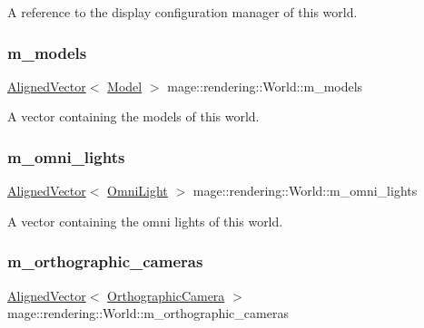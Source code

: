 A reference to the display configuration manager of this world. \hypertarget{classmage_1_1rendering_1_1_world_aed32b3cd3f6d46c68493a48d42047c1f}{}\label{classmage_1_1rendering_1_1_world_aed32b3cd3f6d46c68493a48d42047c1f} 
\subsubsection{\texorpdfstring{m\+\_\+models}{m\_models}}
{\footnotesize\ttfamily \hyperlink{namespacemage_a8664bfb5ce2179fc64eae9f82c8a5ba8}{Aligned\+Vector}$<$ \hyperlink{classmage_1_1rendering_1_1_model}{Model} $>$ mage\+::rendering\+::\+World\+::m\+\_\+models\hspace{0.3cm}{\ttfamily [private]}}

A vector containing the models of this world. \hypertarget{classmage_1_1rendering_1_1_world_ad7314066fa640f62ff56f90b0762a66d}{}\label{classmage_1_1rendering_1_1_world_ad7314066fa640f62ff56f90b0762a66d} 
\subsubsection{\texorpdfstring{m\+\_\+omni\+\_\+lights}{m\_omni\_lights}}
{\footnotesize\ttfamily \hyperlink{namespacemage_a8664bfb5ce2179fc64eae9f82c8a5ba8}{Aligned\+Vector}$<$ \hyperlink{classmage_1_1rendering_1_1_omni_light}{Omni\+Light} $>$ mage\+::rendering\+::\+World\+::m\+\_\+omni\+\_\+lights\hspace{0.3cm}{\ttfamily [private]}}

A vector containing the omni lights of this world. \hypertarget{classmage_1_1rendering_1_1_world_a6cbb80ebd76a1f7121b455251fcab6db}{}\label{classmage_1_1rendering_1_1_world_a6cbb80ebd76a1f7121b455251fcab6db} 
\subsubsection{\texorpdfstring{m\+\_\+orthographic\+\_\+cameras}{m\_orthographic\_cameras}}
{\footnotesize\ttfamily \hyperlink{namespacemage_a8664bfb5ce2179fc64eae9f82c8a5ba8}{Aligned\+Vector}$<$ \hyperlink{classmage_1_1rendering_1_1_orthographic_camera}{Orthographic\+Camera} $>$ mage\+::rendering\+::\+World\+::m\+\_\+orthographic\+\_\+cameras\hspace{0.3cm}{\ttfamily [private]}}


